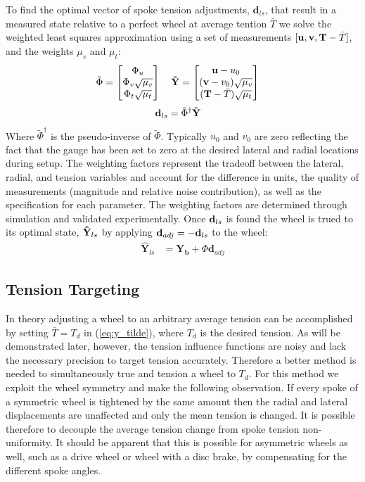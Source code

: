 \documentclass[journal]{IEEEtran}
\begin{document}
To find the optimal vector of spoke tension adjustments, $\mathbf{d}_{ls}$, that result in a measured state relative to a perfect wheel at average tention $\bar T$ we solve the weighted least squares approximation using a set of measurements $ [ {\bf u,v,T}-\bar T ]$, and the weights $\mu_v \text{ and }\mu_t$:
\begin{align}
    \tilde \Phi &= \begin{bmatrix}
    \Phi_u\\
    \Phi_v \sqrt {\mu_v}\\
    \Phi_t \sqrt {\mu_t}
    \end{bmatrix} \quad
    \bf \tilde Y = \begin{bmatrix}
    \mathbf {u} - u_0 \\
   (\mathbf {v}- v_0)  \sqrt {\mu_v}\\
    ( {\bf  T} - \bar T )  \sqrt {\mu_t}
    \end{bmatrix} 
    \label{eq:y_tilde}
\end{align}
\begin{align}
        {\bf d}_{ls} &= \tilde \Phi^\dagger {\bf \tilde Y}
        \label{eq:dls}
\end{align}
Where $\tilde \Phi^\dagger$ is the pseudo-inverse of $\tilde \Phi$.  Typically $u_0$ and $v_0$ are zero reflecting the fact that the gauge has been set to zero at the desired lateral and radial locations during setup. The weighting factors represent the tradeoff between the lateral, radial, and tension variables and account for the difference in units, the quality of measurements (magnitude and relative noise contribution), as well as the specification for each parameter. The weighting factors are determined through simulation and validated experimentally. Once ${\bf d}_{ls}$ is found the wheel is trued to its optimal state, ${\bf \hat Y}_{ls}$ by applying $\mathbf{d}_{adj} = -{\bf d}_{ls}$ to the wheel:
\begin{align}
\mathbf{\hat Y}_{ls} &= \mathbf{Y_b} + \Phi  \mathbf{d} _{adj}
\label{eq:Yls}
\end{align}

\subsection{Tension Targeting}
In theory adjusting a wheel to an arbitrary average tension can be accomplished by setting $\bar T = T_d$ in (\ref{eq:y_tilde}), where $T_d$ is the desired tension. As will be demonstrated later, however, the tension influence functions are noisy and lack the necessary precision to target tension accurately. Therefore a better method is needed to simultaneously true and tension a wheel to $T_d$.  For this method we exploit the wheel symmetry and make the following observation.  If every spoke of a symmetric wheel is tightened by the same amount then the radial and lateral displacements are unaffected and only the mean tension is changed. It is possible therefore to decouple the average tension change from spoke tension non-uniformity. It should be apparent that this is possible for asymmetric wheels as well, such as a drive wheel or wheel with a disc brake, by compensating for the different spoke angles. 
\end{document}
